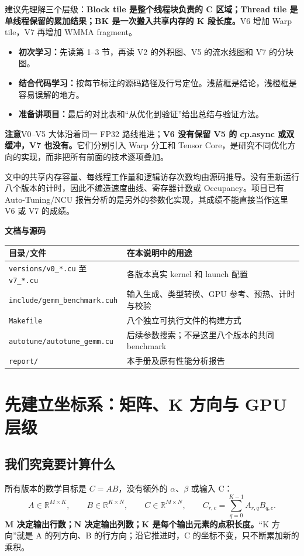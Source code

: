 \documentclass[UTF8,11pt,a4paper,fontset=fandol]{ctexart}
\newcommand{\code}[1]{\nolinkurl{#1}}
\newcommand{\caution}[1]{\par\noindent\colorbox{PaleOrange}{\parbox{\dimexpr\linewidth-2\fboxsep\relax}{\textbf{注意}\quad #1}}\par}
\newcommand{\pagebreakhere}{\clearpage}
\begin{document}
建议先理解三个层级：\textbf{Block tile 是整个线程块负责的 C 区域；Thread tile 是单线程保留的累加结果；BK 是一次搬入共享内存的 K 段长度。}V6 增加 Warp tile，V7 再增加 WMMA fragment。

\begin{itemize}
\item \textbf{初次学习：}先读第 1--3 节，再读 V2 的外积图、V5 的流水线图和 V7 的分块图。
\item \textbf{结合代码学习：}按每节标注的源码路径及行号定位。浅蓝框是结论，浅橙框是容易误解的地方。
\item \textbf{准备讲项目：}最后的对比表和“从优化到验证”给出总结与验证方法。
\end{itemize}

\caution{V0--V5 大体沿着同一 FP32 路线推进；\textbf{V6 没有保留 V5 的 cp.async 或双缓冲，V7 也没有。}它们分别引入 Warp 分工和 Tensor Core，是研究不同优化方向的实现，而非把所有前面的技术逐项叠加。}

文中的共享内存容量、每线程工作量和逻辑访存次数均由源码推导。没有重新运行八个版本的计时，因此不编造速度曲线、寄存器计数或 Occupancy。项目已有 Auto-Tuning/NCU 报告分析的是另外的参数化实现，其成绩不能直接当作这里 V6 或 V7 的成绩。

\vspace{0.6cm}
\noindent\textbf{文档与源码}\par
\noindent\begin{tabularx}{\linewidth}{lX}
\toprule
目录/文件 & 在本说明中的用途\\\midrule
\code{versions/v0_*.cu} 至 \code{v7_*.cu} & 各版本真实 kernel 和 launch 配置\\
\code{include/gemm_benchmark.cuh} & 输入生成、类型转换、GPU 参考、预热、计时与校验\\
\code{Makefile} & 八个独立可执行文件的构建方式\\
\code{autotune/autotune_gemm.cu} & 后续参数搜索；不是这里八个版本的共同 benchmark\\
\code{report/} & 本手册及原有性能分析报告\\\bottomrule
\end{tabularx}
\pagebreakhere
\tableofcontents
\pagebreakhere
{}

\section{先建立坐标系：矩阵、K 方向与 GPU 层级}
\subsection{我们究竟要计算什么}
所有版本的数学目标是 $C=AB$，没有额外的 $\alpha$、$\beta$ 或输入 C：
\[
A\in\mathbb{R}^{M\times K},\qquad B\in\mathbb{R}^{K\times N},\qquad
C\in\mathbb{R}^{M\times N},\qquad
C_{r,c}=\sum_{q=0}^{K-1} A_{r,q}B_{q,c}.
\]
\textbf{M 决定输出行数；N 决定输出列数；K 是每个输出元素的点积长度。}“K 方向”就是 A 的列方向、B 的行方向；沿它推进时，C 的坐标不变，只不断累加新的乘积。
\end{document}
